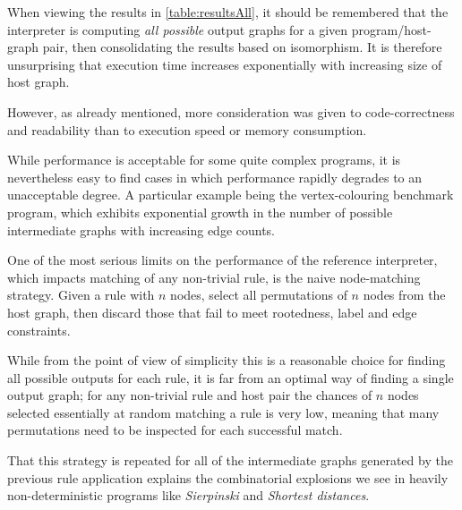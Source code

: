 

When viewing the results in \ref{table:resultsAll}, it should be remembered that the interpreter is computing \textit{all possible} output graphs for a given program/host-graph pair, then consolidating the results based on isomorphism. It is therefore unsurprising that execution time increases exponentially with increasing size of host graph.

However, as already mentioned, more consideration was given to code-correctness and readability than to execution speed or memory consumption.

While performance is acceptable for some quite complex programs, it is nevertheless easy to find cases in which performance rapidly degrades to an unacceptable degree. A particular example being the vertex-colouring benchmark program, which exhibits exponential growth in the number of possible intermediate graphs with increasing edge counts.

One of the most serious limits on the performance of the reference interpreter, which impacts matching of any non-trivial rule, is the naive node-matching strategy. Given a rule with $n$ nodes, select all permutations of $n$ nodes from the host graph, then discard those that fail to meet rootedness, label and edge constraints.

While from the point of view of simplicity this is a reasonable choice for finding all possible outputs for each rule, it is far from an optimal way of finding a single output graph; for any non-trivial rule and host pair the chances of $n$ nodes selected essentially at random matching a rule is very low, meaning that many permutations need to be inspected for each successful match.

That this strategy is repeated for all of the intermediate graphs generated by the previous rule application explains the combinatorial explosions we see in heavily non-deterministic programs like \textit{Sierpinski} and \textit{Shortest distances}.



